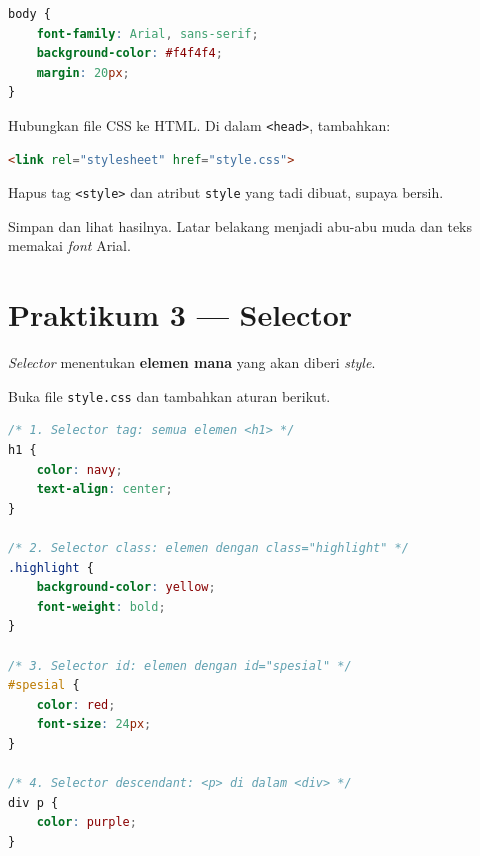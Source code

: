 \begin{lstlisting}[language=CSS, caption={Isi style.css}, label={lst:style-css}]
body {
    font-family: Arial, sans-serif;
    background-color: #f4f4f4;
    margin: 20px;
}
\end{lstlisting}

\begin{langkah}
  \item Hubungkan file CSS ke HTML. Di dalam \texttt{<head>}, tambahkan:
\end{langkah}

\begin{lstlisting}[language=HTML, caption={Penghubung eksternal CSS}, label={lst:link-css}]
<link rel="stylesheet" href="style.css">
\end{lstlisting}

\begin{langkah}
  \item Hapus tag \texttt{<style>} dan atribut \texttt{style} yang tadi dibuat, supaya bersih.
  \item Simpan dan lihat hasilnya. Latar belakang menjadi abu-abu muda dan teks memakai \emph{font} Arial.
\end{langkah}

\section{Praktikum 3 --- Selector}
\label{sec:praktik-selector}

\emph{Selector} menentukan \textbf{elemen mana} yang akan diberi \emph{style}.

\begin{langkah}
  \item Buka file \texttt{style.css} dan tambahkan aturan berikut.
\end{langkah}

\begin{lstlisting}[language=CSS, caption={Berbagai jenis selector}, label={lst:selector}]
/* 1. Selector tag: semua elemen <h1> */
h1 {
    color: navy;
    text-align: center;
}

/* 2. Selector class: elemen dengan class="highlight" */
.highlight {
    background-color: yellow;
    font-weight: bold;
}

/* 3. Selector id: elemen dengan id="spesial" */
#spesial {
    color: red;
    font-size: 24px;
}

/* 4. Selector descendant: <p> di dalam <div> */
div p {
    color: purple;
}
\end{lstlisting}


